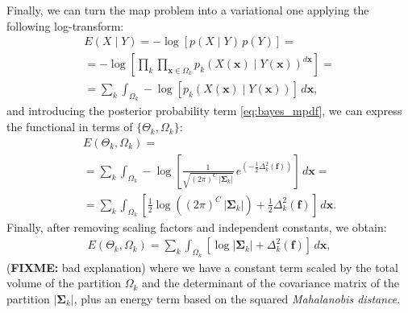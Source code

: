 Finally, we can turn the \gls{map} problem into a variational one
applying the following log-transform:
\begin{multline}
E(X \mid Y)= -\log \left[ p(X \mid Y) \, p(Y) \right] = \\
= -\log \left[ \underset{k}{\prod} \underset{\mathbf{x}\in \Omega_k}{\prod}
p_k( X(\mathbf{x}) \mid Y(\mathbf{x}) )^{d\mathbf{x}} \right] = \\
= \sum\limits_k \int_{\Omega_k} -\log \left[ p_k(X(\mathbf{x}) \mid Y(\mathbf{x} ) ) \right] \, d\mathbf{x},
\label{eq:energy_1}
\end{multline}
and introducing the posterior probability term \eqref{eq:bayes_mpdf}, 
we can express the functional in terms of $\lbrace\Theta_k,\Omega_k\rbrace$:
\begin{multline}
E(\Theta_k,\Omega_k) = \\
= \sum\limits_k \int_{\Omega_k} -\log \left[ \frac{1}{ \sqrt{(2\pi)^{C}\,\left|\boldsymbol{\Sigma}_{k}\right|}}\,{e^{\left(-\frac{1}{2}  \Delta^2_k (\mathbf{f}) \right)}} \right] \, d\mathbf{x} = \\
= \sum\limits_k \int_{\Omega_k} \left[ \frac{1}{2} \log{ \left( (2\pi)^{C}\,\left|\boldsymbol{\Sigma}_{k}\right| \right)} + \frac{1}{2}  \Delta^2_k (\mathbf{f}) \right] \,d\mathbf{x}.
\end{multline}
Finally, after removing scaling factors and independent constants,
we obtain:
\begin{align}
E(\Theta_k,\Omega_k) = \sum\limits_k \int_{\Omega_k} \left[ \log \left|\mathbf{\Sigma}_k\right| + \Delta^2_k (\mathbf{f}) \right] \,d\mathbf{x},
\label{eq:map_energy}
\end{align}
(\textbf{FIXME:} bad explanation) where we have a constant term scaled by
the total volume of the partition $\Omega_k$ and the determinant of the 
covariance matrix of the partition $\left|\boldsymbol{\Sigma}_{k}\right|$,
plus an energy term based on the squared \emph{Mahalanobis distance}.

